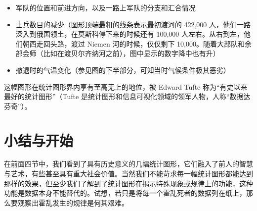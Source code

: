 \documentclass[
  b5paper,
  UTF8,twoside]{book}
\providecommand{\tightlist}{%
  \setlength{\itemsep}{0pt}\setlength{\parskip}{0pt}}
\begin{document}
\begin{itemize}
\tightlist
\item
  军队的位置和前进方向，以及一路上军队的分支和汇合情况
\item
  士兵数目的减少（图形顶端最粗的线条表示最初渡河的 422,000 人，他们一路深入到俄国领土，在莫斯科停下来的时候还有 100,000 人左右。从右到左，他们朝西走回头路，渡过 Niemen 河的时候，仅仅剩下 10,000。随着大部队和余部会师（比如在渡贝尔齐纳河之前），图中显示的数字降中也有升）
\item
  撤退时的气温变化（参见图的下半部分，可知当时气候条件极其恶劣）
\end{itemize}

这幅图形在统计图形界内享有至高无上的地位，被 Edward Tufte 称为``有史以来最好的统计图形''（Tufte 是统计图形和信息可视化领域的领军人物，人称``数据达芬奇''）。

\section{小结与开始}\label{sec:begin}

在前面四节中，我们看到了具有历史意义的几幅统计图形，它们融入了前人的智慧与艺术，有些甚至具有重大社会价值。当然我们不能苛求每一幅统计图形都能达到那样的效果，但至少我们了解到了统计图形在揭示特殊现象或规律上的功能，这种功能是数据本身不能替代的。试想，若只是将每一个霍乱死者的数据列在纸上，那么要观察出霍乱发生的规律是何其艰难。
\end{document}
